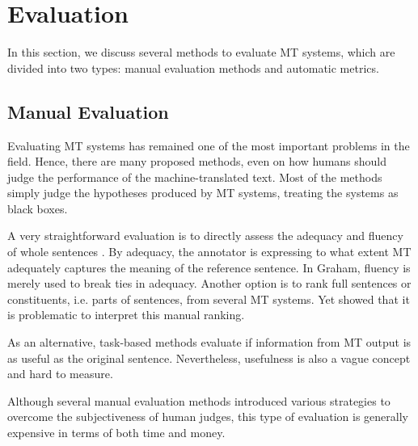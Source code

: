 \section{Evaluation}
\label{the-eval}

In this section, we discuss several methods to evaluate MT systems, which are divided into two types: manual evaluation methods and automatic metrics.

\subsection{Manual Evaluation}
\label{the-eval-manual}
Evaluating MT systems has remained one of the most important problems in the field.
Hence, there are many proposed methods, even on how humans should judge the performance of the machine-translated text.
Most of the methods simply judge the hypotheses produced by MT systems, treating the systems as black boxes.

A very straightforward evaluation is to directly assess the adequacy and fluency of whole sentences \citep{DBLP:conf/acllaw/GrahamBMZ13}.
By adequacy, the annotator is expressing to what extent MT adequately captures the meaning of the reference sentence.
In Graham, fluency is merely used to break ties in adequacy.
Another option is to rank full sentences or constituents, i.e. parts of sentences, from several MT systems.
Yet \cite{DBLP:conf/wmt/BojarEPZ11} showed that it is problematic to interpret this manual ranking.


As an alternative, task-based methods evaluate if information from MT output is as useful as the original sentence. Nevertheless, usefulness is also a vague concept and hard to measure.


Although several manual evaluation methods introduced various strategies to overcome the subjectiveness of human judges, this type of evaluation is generally expensive in terms of both time and money.


